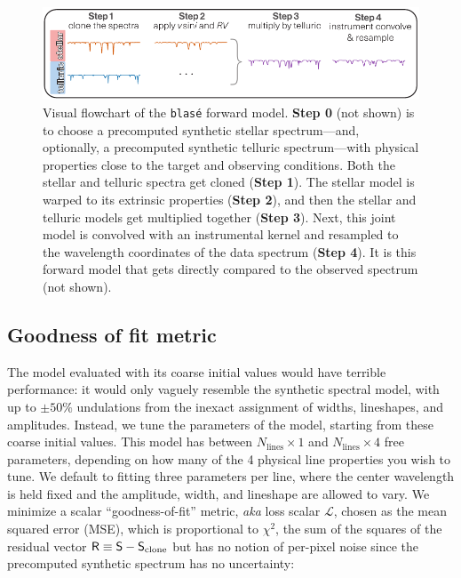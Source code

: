 \documentclass[twocolumn]{aastex631}
\begin{document}
\begin{figure}[hbt!]
    \centering
    \includegraphics[width=1.0\textwidth]{blase_flowchart03.pdf}
    \caption{Visual flowchart of the \texttt{blas\'e} forward model.  \textbf{Step 0} (not shown) is to choose a precomputed synthetic stellar spectrum---and, optionally, a precomputed synthetic telluric spectrum---with physical properties close to the target and observing conditions.  Both the stellar and telluric spectra get cloned (\textbf{Step 1}).  The stellar model is warped to its extrinsic properties (\textbf{Step 2}), and then the stellar and telluric models get multiplied together (\textbf{Step 3}).  Next, this joint model is convolved with an instrumental kernel and resampled to the wavelength coordinates of the data spectrum (\textbf{Step 4}).  It is this forward model that gets directly compared to the observed spectrum (not shown).
    }
    \label{blase_flowchart}
\end{figure}

\subsection{Goodness of fit metric}
The model evaluated with its coarse initial values would have terrible performance: it would only vaguely resemble the synthetic spectral model, with up to $\pm 50\%$ undulations from the inexact assignment of widths, lineshapes, and amplitudes. Instead, we tune the parameters of the model, starting from these coarse initial values. This model has between $N_{\mathrm{lines}}\times 1$ and $N_{\mathrm{lines}}\times 4$ free parameters, depending on how many of the 4 physical line properties you wish to tune.  We default to fitting three parameters per line, where the center wavelength is held fixed and the amplitude, width, and lineshape are allowed to vary. We minimize a scalar ``goodness-of-fit'' metric, \emph{aka} loss scalar $\mathcal{L}$, chosen as the mean squared error (MSE), which is proportional to $\chi^2$, the sum of the squares of the residual vector $\mathsf{R} \equiv \mathsf{S}-\mathsf{S}_{\rm clone}$ but has no notion of per-pixel noise since the precomputed synthetic spectrum has no uncertainty:
\end{document}
